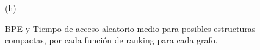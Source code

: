 \begin{figure}
\begin{minipage}{1\textwidth}
\begin{minipage}{0.45\textwidth}
\begin{minipage}{0.2\textwidth}
    			\end{minipage}
    			
    			(h)
    		\end{minipage}  
    	\end{minipage}    	
    	
    	
%    		
    	 
    \caption{BPE y Tiempo de acceso aleatorio medio para posibles estructuras compactas, por cada función de ranking para cada grafo.}
    \label{fig:sdslBPEAle}
\end{figure}

